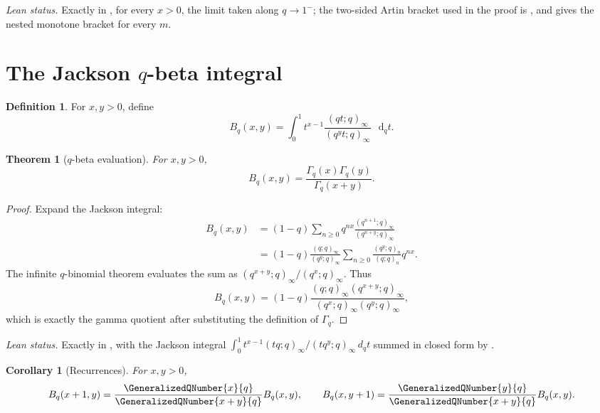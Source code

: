 \documentclass[11pt,a4paper,oneside,openany]{book}
\newtheorem{theorem}{Theorem}[chapter]
\newtheorem{corollary}[corollary]{Corollary}
\theoremstyle{definition}
\newtheorem{definition}[definition]{Definition}
\theoremstyle{remark}
\newcommand{\JacksonDifferential}[2]{\mathop{}\!\mathrm d_{#1}#2}
\begin{document}
\emph{Lean status.}  Exactly  in
, for every $x>0$, the limit taken along $q\to1^-$;
the two-sided Artin bracket used in the proof is , and
 gives the nested monotone bracket
 for every $m$.


\section{The Jackson \texorpdfstring{$q$}{q}-beta integral}

\begin{definition}
For $x,y>0$, define
\[
 B_q(x,y)=\int_0^1 t^{x-1}
 \frac{(qt;q)_\infty}{(q^yt;q)_\infty}\,\JacksonDifferential{q}{t}.
\]
\end{definition}

\begin{theorem}[$q$-beta evaluation]\label{thm:qbeta}
For $x,y>0$,
\[
 B_q(x,y)=\frac{\Gamma_q(x)\Gamma_q(y)}{\Gamma_q(x+y)}.
\]
\end{theorem}

\begin{proof}
Expand the Jackson integral:
\begin{align*}
 B_q(x,y)
 &=(1-q)\sum_{n\ge0}q^{nx}
 \frac{(q^{n+1};q)_\infty}{(q^{n+y};q)_\infty}\\
 &=(1-q)\frac{(q;q)_\infty}{(q^y;q)_\infty}
 \sum_{n\ge0}\frac{(q^y;q)_n}{(q;q)_n}q^{nx}.
\end{align*}
The infinite $q$-binomial theorem evaluates the sum as
\(
 (q^{x+y};q)_\infty/(q^x;q)_\infty.
\)
Thus
\[
 B_q(x,y)
 =(1-q)\frac{(q;q)_\infty(q^{x+y};q)_\infty}
 {(q^x;q)_\infty(q^y;q)_\infty},
\]
which is exactly the gamma quotient after substituting the definition of $\Gamma_q$.
\end{proof}

\emph{Lean status.}  Exactly  in ,
with  the Jackson integral $\int_0^1t^{x-1}(tq;q)_\infty/(tq^y;q)_\infty\,d_qt$
summed in closed form by .


\begin{corollary}[Recurrences]\label{cor:qbeta-recurrence}
For $x,y>0$,
\[
 B_q(x+1,y)=
 \frac{\GeneralizedQNumber{x}{q}}{\GeneralizedQNumber{x+y}{q}}B_q(x,y),
\qquad
 B_q(x,y+1)=
 \frac{\GeneralizedQNumber{y}{q}}{\GeneralizedQNumber{x+y}{q}}B_q(x,y).
\]
\end{corollary}
\end{document}
